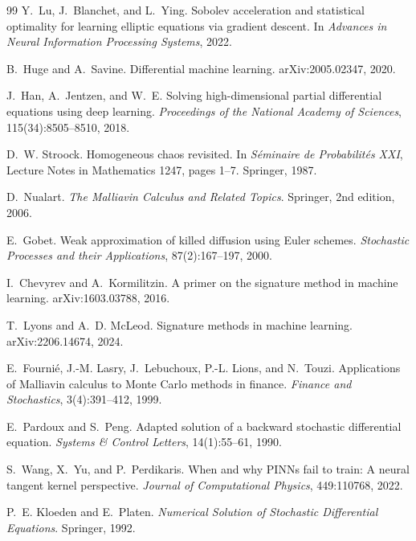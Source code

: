 \documentclass[english]{article}
\begin{document}
\begin{thebibliography}{99}
Y.~Lu, J.~Blanchet, and L.~Ying.
\newblock Sobolev acceleration and statistical optimality for learning elliptic
  equations via gradient descent.
\newblock In \emph{Advances in Neural Information Processing Systems}, 2022.

B.~Huge and A.~Savine.
\newblock Differential machine learning.
\newblock arXiv:2005.02347, 2020.

J.~Han, A.~Jentzen, and W.~E.
\newblock Solving high-dimensional partial differential equations using deep learning.
\newblock \emph{Proceedings of the National Academy of Sciences}, 115(34):8505--8510, 2018.

D.~W. Stroock.
\newblock Homogeneous chaos revisited.
\newblock In \emph{S\'eminaire de Probabilit\'es XXI}, Lecture Notes in
  Mathematics 1247, pages 1--7. Springer, 1987.

D.~Nualart.
\newblock \emph{The {M}alliavin Calculus and Related Topics}.
\newblock Springer, 2nd edition, 2006.

E.~Gobet.
\newblock Weak approximation of killed diffusion using {E}uler schemes.
\newblock \emph{Stochastic Processes and their Applications}, 87(2):167--197, 2000.

I.~Chevyrev and A.~Kormilitzin.
\newblock A primer on the signature method in machine learning.
\newblock arXiv:1603.03788, 2016.

T.~Lyons and A.~D. McLeod.
\newblock Signature methods in machine learning.
\newblock arXiv:2206.14674, 2024.

E.~Fourni\'e, J.-M. Lasry, J.~Lebuchoux, P.-L. Lions, and N.~Touzi.
\newblock Applications of {M}alliavin calculus to {M}onte {C}arlo methods in finance.
\newblock \emph{Finance and Stochastics}, 3(4):391--412, 1999.

E.~Pardoux and S.~Peng.
\newblock Adapted solution of a backward stochastic differential equation.
\newblock \emph{Systems \& Control Letters}, 14(1):55--61, 1990.

S.~Wang, X.~Yu, and P.~Perdikaris.
\newblock When and why {PINN}s fail to train: A neural tangent kernel perspective.
\newblock \emph{Journal of Computational Physics}, 449:110768, 2022.

P.~E. Kloeden and E.~Platen.
\newblock \emph{Numerical Solution of Stochastic Differential Equations}.
\newblock Springer, 1992.


\end{thebibliography}
\end{document}
